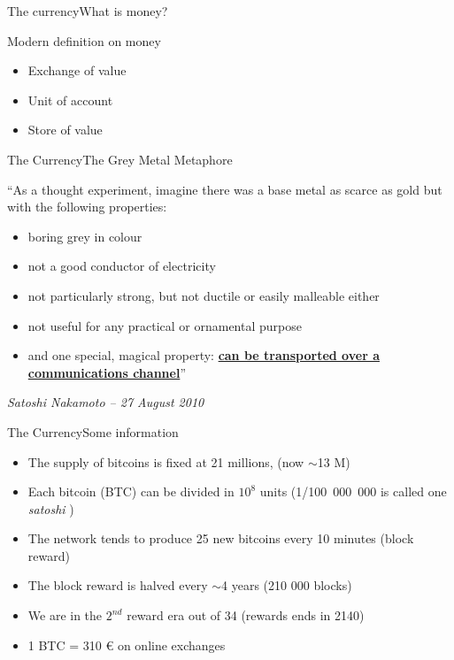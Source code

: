 \documentclass[english,compress]{beamer}
\newcommand{\powemph}[1]{\textbf{\underline{#1}}}
\begin{document}
\begin{frame}{The currency}{What is money?}

\begin{exampleblock}{Modern definition on money}
\begin{itemize}
 \item Exchange of value
 \item Unit of account
 \item Store of value
\end{itemize}
\end{exampleblock}
\end{frame}




\begin{frame}{The Currency}{The Grey Metal Metaphore}

``As a thought experiment, imagine there was a base metal as scarce as gold but with the following properties:

\begin{itemize}
 \item boring grey in colour
 \item not a good conductor of electricity
 \item not particularly strong, but not ductile or easily malleable either
 \item not useful for any practical or ornamental purpose
 \item and one special, magical property: \powemph{can be transported over a communications channel}''
\end{itemize}

\em{Satoshi Nakamoto -- 27 August 2010}
\end{frame}

\begin{frame}{The Currency}{Some information}
 \begin{itemize}
  \item The supply of bitcoins is fixed at 21 millions, (now $\sim$13 M)
  \item Each bitcoin (BTC) can be divided in $10^8$ units (\mbox{1/100 000 000} is called one \emph{satoshi} )
  \item The network tends to produce 25 new bitcoins every 10 minutes (block reward)
  \item The block reward is halved every $\sim$4 years (210 000 blocks)
  \item We are in the $2^{nd}$ reward era out of 34 (rewards ends in 2140)
  \item 1 BTC = 310 € on online exchanges
 \end{itemize}

\end{frame}
\end{document}
